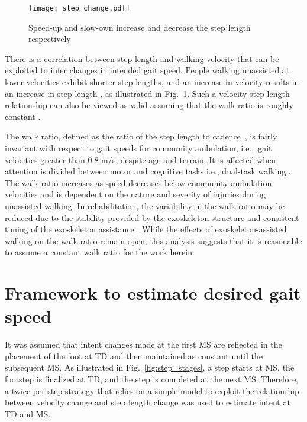 \begin{figure}
	\centering
	\texttt{[image: step\_change.pdf]}
	\caption{Speed-up and slow-own increase and decrease the step length respectively}\label{fig:step_change}
\end{figure}

There is a correlation between step length and walking velocity that can be exploited to infer changes in intended gait speed. People walking unassisted at lower velocities exhibit shorter step lengths, and an increase in velocity results in an increase in step length \cite{kuo2001simple,andriacchi1977walking}, as illustrated in Fig.~\ref{fig:step_change}. Such a velocity-step-length relationship can also be viewed as valid assuming that the walk ratio is roughly constant \cite{sekiya1997optimal}. 

The walk ratio, defined as the ratio of the step length to cadence~\cite{rota2011walk}, is fairly invariant with respect to gait speeds for community ambulation, i.e.,~gait velocities greater than 0.8 m/s, despite age and terrain. It is affected when attention is divided between motor and cognitive tasks i.e., dual-task walking \cite{bogen2018walk}. The walk ratio increases as speed decreases below community ambulation velocities \cite{murakami2017estimated} and is dependent on the nature and severity of injuries \cite{rota2011walk} during unassisted walking. In rehabilitation, the variability in the walk ratio may be reduced due to the stability provided by the exoskeleton structure and consistent timing of the exoskeleton assistance \cite{seo2015new}. While the effects of exoskeleton-assisted walking on the walk ratio remain open, this analysis suggests that it is reasonable to assume a constant walk ratio for the work herein.

\section{Framework to estimate desired gait speed}

It was assumed that intent changes made at the first MS are reflected in the placement of the foot at TD and then maintained as constant until the subsequent MS. As illustrated in Fig.~\ref{fig:step_stages}, a step starts at MS, the footstep is finalized at TD, and the step is completed at the next MS. Therefore, a twice-per-step strategy that relies on a simple model to exploit the relationship between velocity change and step length change was used to estimate intent at TD and MS. 

